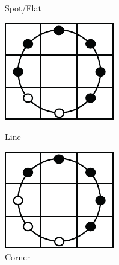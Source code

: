 \begin{figure}[H]
\begin{minipage}[b]{.18\textwidth}
  \caption*{Spot/Flat}
\end{minipage}
\begin{minipage}[b]{.18\textwidth}
  \centering
  \includegraphics[width=.9\linewidth]{figures/lbp_line}
  \caption*{Line}
\end{minipage}
\begin{minipage}[b]{.18\textwidth}
  \centering
  \includegraphics[width=.9\linewidth]{figures/lbp_corner}
  \caption*{Corner}
\end{minipage}
\begin{minipage}[b]{.18\textwidth}
  \centering

\end{minipage}
\end{figure}

